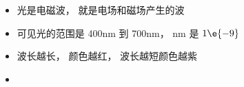 
\begin{issues}
\issueDraft
\end{issues}

\begin{itemize}
\item 光是电磁波， 就是电场和磁场产生的波
\item 可见光的范围是 400nm 到 700nm， nm 是 $1\e{-9}$
\item 波长越长， 颜色越红， 波长越短颜色越紫
\item 
\end{itemize}

